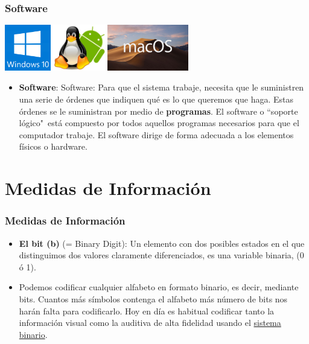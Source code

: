 \documentclass{beamer}
\begin{document}
\begin{frame}[fragile]\frametitle{Software}
\begin{center}
\includegraphics[height=2cm]{figs/Windows-10.png}\hfill\includegraphics[height=2cm]{figs/linux-android.jpg}\hfill\includegraphics[height=2cm]{figs/MacOS.jpg}
\end{center}
\begin{itemize}
\item \textbf{Software}: Software: Para que el sistema trabaje, necesita que le suministren una serie de órdenes que indiquen qué es lo que queremos que haga. Estas órdenes se le suministran por medio de \textbf{programas}. El software o ``soporte lógico"\, está compuesto por todos aquellos programas necesarios para que el computador trabaje. El software dirige de forma adecuada a los elementos físicos o hardware.
\end{itemize}
\end{frame}

\section{Medidas de Información}
\begin{frame}[fragile]\frametitle{Medidas de Información}
\begin{itemize}
\item \textbf{El bit (b)} (= Binary Digit): Un elemento con dos posibles estados en el que distinguimos dos valores claramente diferenciados, es una variable binaria, (0 ó 1).
\item Podemos codificar cualquier alfabeto en formato binario, es decir, mediante bits. Cuantos más símbolos contenga el alfabeto más número de bits nos harán falta para codificarlo. Hoy en día es habitual codificar tanto la información visual como la auditiva de alta fidelidad usando el \href{https://es.wikipedia.org/wiki/Sistema_binario}{sistema binario}.
\end{itemize}
\end{frame}
\end{document}
